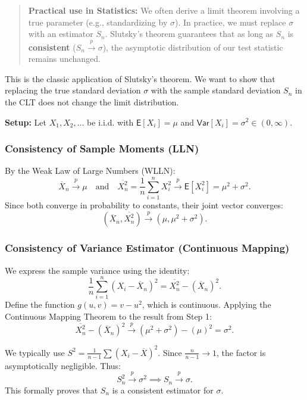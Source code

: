 \begin{quote}
    \textbf{Practical use in Statistics:} We often derive a limit theorem involving a true parameter (e.g., standardizing by $\sigma$). In practice, we must replace $\sigma$ with an estimator $S_n$. Slutsky's theorem guarantees that as long as $S_n$ is \textbf{consistent} ($S_n \xrightarrow{p} \sigma$), the asymptotic distribution of our test statistic remains unchanged.
\end{quote}


\begin{ex}

This is the classic application of Slutsky's theorem. We want to show that replacing the true standard deviation $\sigma$ with the sample standard deviation $S_n$ in the CLT does not change the limit distribution.

\textbf{Setup:} Let $X_1, X_2, \dots$ be i.i.d. with $\mathsf{E}[X_i] = \mu$ and $\mathsf{Var}[X_i] = \sigma^2 \in (0, \infty)$.

\subsubsection*{Consistency of Sample Moments (LLN)}
By the Weak Law of Large Numbers (WLLN):
\[ \overline{X}_n \xrightarrow{p} \mu \quad \text{and} \quad \overline{X^2_n} = \frac{1}{n} \sum_{i=1}^n X_i^2 \xrightarrow{p} \mathsf{E}[X_i^2] = \mu^2 + \sigma^2. \]
Since both converge in probability to constants, their joint vector converges:
\[ \left(\overline{X}_n, \overline{X^2_n}\right) \xrightarrow{p} (\mu, \mu^2 + \sigma^2). \]

\subsubsection*{Consistency of Variance Estimator (Continuous Mapping)}
We express the sample variance using the identity:
\[ \frac{1}{n} \sum_{i=1}^{n} (X_i - \overline{X}_n)^2 = \overline{X^2_n} - (\overline{X}_n)^2. \]
Define the function $g(u, v) = v - u^2$, which is continuous. Applying the Continuous Mapping Theorem to the result from Step 1:
\[ \overline{X^2_n} - (\overline{X}_n)^2 \xrightarrow{p} (\mu^2 + \sigma^2) - (\mu)^2 = \sigma^2. \]
\begin{remark}
    
We typically use $S^2 = \frac{1}{n-1} \sum (X_i - \overline{X})^2$. Since $\frac{n}{n-1} \to 1$, the factor is asymptotically negligible. Thus:
\[ S_n^2 \xrightarrow{p} \sigma^2 \implies S_n \xrightarrow{p} \sigma. \]
This formally proves that $S_n$ is a consistent estimator for $\sigma$.
\end{remark}


\end{ex}
